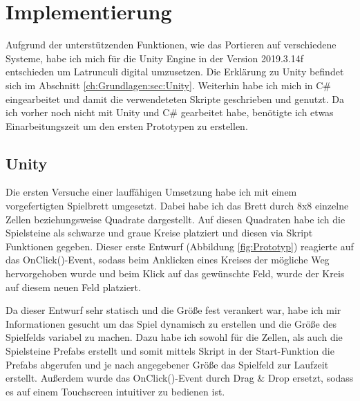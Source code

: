 
\chapter{Implementierung}
\label{ch:Implementierung}

Aufgrund der unterstützenden Funktionen, wie das Portieren auf verschiedene Systeme, habe ich mich für die Unity Engine in der Version 2019.3.14f entschieden um Latrunculi digital umzusetzen. Die Erklärung zu Unity befindet sich im Abschnitt \ref{ch:Grundlagen:sec:Unity}. Weiterhin habe ich mich in C\# eingearbeitet und damit die verwendeteten Skripte geschrieben und genutzt. Da ich vorher noch nicht mit Unity und C\# gearbeitet habe, benötigte ich etwas Einarbeitungszeit um den ersten Prototypen zu erstellen.


\section{Unity}
\label{ch:Implementierung:sec:Unity}

Die ersten Versuche einer lauffähigen Umsetzung habe ich mit einem vorgefertigten Spielbrett umgesetzt. Dabei habe ich das Brett durch 8x8 einzelne Zellen beziehungsweise Quadrate dargestellt.%
 Auf diesen Quadraten habe ich die Spielsteine als schwarze und graue Kreise platziert und diesen via Skript Funktionen gegeben. Dieser erste Entwurf (Abbildung \ref{fig:Prototyp}) reagierte auf das OnClick()-Event, sodass beim Anklicken eines Kreises der mögliche Weg hervorgehoben wurde und beim Klick auf das gewünschte Feld, wurde der Kreis auf diesem neuen Feld platziert.



Da dieser Entwurf sehr statisch und die Größe fest verankert war, habe ich mir Informationen gesucht um das Spiel dynamisch zu erstellen und die Größe des Spielfelds variabel zu machen. Dazu habe ich sowohl für die Zellen, als auch die Spielsteine Prefabs erstellt und somit mittels Skript in der Start-Funktion die Prefabs abgerufen und je nach angegebener Größe das Spielfeld zur Laufzeit erstellt.
Außerdem wurde das OnClick()-Event durch Drag \& Drop ersetzt, sodass es auf einem Touchscreen intuitiver zu bedienen ist.
